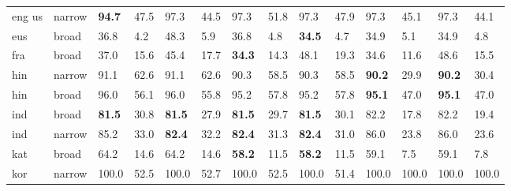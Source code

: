\begin{center}
{\begin{tabularx}{1.2\textwidth}{|Xl||ll||ll||ll||ll||ll||ll|}
eng us             & narrow        & \textbf{94.7}      & 47.5             & 97.3               & 44.5              & 97.3                & 51.8              & 97.3                & 47.9               & 97.3              & 45.1             & 97.3               & 44.1             \\
eus                & broad         & 36.8               & 4.2              & 48.3               & 5.9               & 36.8                & 4.8               & \textbf{34.5}       & 4.7                & 34.9              & 5.1              & 34.9               & 4.8              \\
fra                & broad         & 37.0               & 15.6             & 45.4               & 17.7              & \textbf{34.3}       & 14.3              & 48.1                & 19.3               & 34.6              & 11.6             & 48.6               & 15.5             \\
hin                & narrow        & 91.1               & 62.6             & 91.1               & 62.6              & 90.3                & 58.5              & 90.3                & 58.5               & \textbf{90.2}     & 29.9             & \textbf{90.2}      & 30.4             \\
hin                & broad         & 96.0               & 56.1             & 96.0               & 55.8              & 95.2                & 57.8              & 95.2                & 57.8               & \textbf{95.1}     & 47.0             & \textbf{95.1}      & 47.0             \\
ind                & broad         & \textbf{81.5}      & 30.8             & \textbf{81.5}      & 27.9              & \textbf{81.5}       & 29.7              & \textbf{81.5}       & 30.1               & 82.2              & 17.8             & 82.2               & 19.4             \\
ind                & narrow        & 85.2               & 33.0             & \textbf{82.4}      & 32.2              & \textbf{82.4}       & 31.3              & \textbf{82.4}       & 31.0               & 86.0              & 23.8             & 86.0               & 23.6             \\
kat                & broad         & 64.2               & 14.6             & 64.2               & 14.6              & \textbf{58.2}       & 11.5              & \textbf{58.2}       & 11.5               & 59.1              & 7.5              & 59.1               & 7.8              \\
kor                & narrow        & 100.0              & 52.5             & 100.0              & 52.7              & 100.0               & 52.5              & 100.0               & 51.4               & 100.0             & 100.0            & 100.0              & 100.0            \\

\end{tabularx}}
\end{center}
